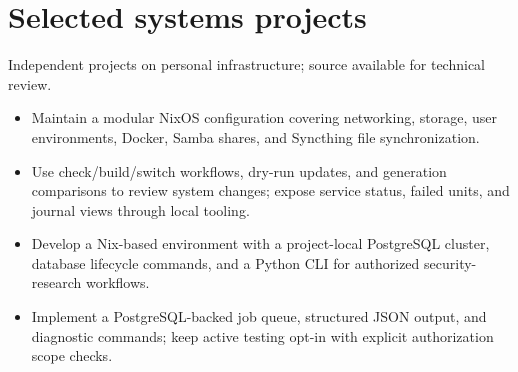 \section{Selected systems projects}
{\small\color{muted}Independent projects on personal infrastructure; source available for technical review.}\par
{}
\begin{itemize}
    \item Maintain a modular NixOS configuration covering networking, storage, user environments,
    Docker, Samba shares, and Syncthing file synchronization.
    \item Use check/build/switch workflows, dry-run updates, and generation comparisons to review
    system changes; expose service status, failed units, and journal views through local tooling.
\end{itemize}
\vspace{4pt}
\begin{itemize}
    \item Develop a Nix-based environment with a project-local PostgreSQL cluster, database
    lifecycle commands, and a Python CLI for authorized security-research workflows.
    \item Implement a PostgreSQL-backed job queue, structured JSON output, and diagnostic commands;
    keep active testing opt-in with explicit authorization scope checks.
\end{itemize}

